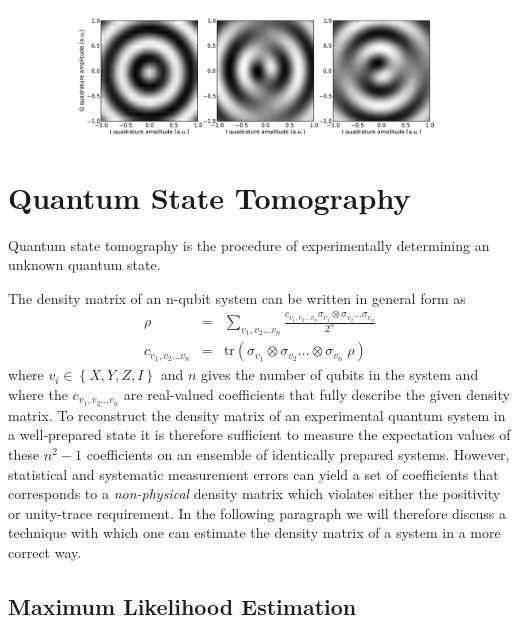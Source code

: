 \begin{figure}
	\centering
		\includegraphics[width=1.\textwidth]{"./data/ct5/2010_12_01 - iq tomography/iq_tomographies"}
	\label{fig:SingleQubitIQControl}
	\caption{}
\end{figure}

%
\section{Quantum State Tomography}

Quantum state tomography is the procedure of experimentally determining an unknown quantum state\citep{michael_a._nielsen_quantum_2000}.

The density matrix of an n-qubit system can be written in general form as
\begin{eqnarray}
\rho & = & \sum\limits_{v_1,v_2\hdots v_n} \frac{c_{v_1,v_2\hdots v_n} \sigma_{v_1}\otimes \sigma_{v_2}\hdots \sigma_{v_n}}{2^n} \label{eq:state_tomography_state_representation} \\
c_{v_1,v_2\hdots v_n} & = & \mathrm{tr}\left(\sigma_{v_1}\otimes \sigma_{v_2}\hdots \otimes\sigma_{v_n} \; \rho \right)  \label{eq:state_tomography_coefficients}
\end{eqnarray}
where $v_i \in \left\{ X,Y,Z,I\right\}$ and $n$ gives the number of qubits in the system and where the $c_{v_1,v_2\hdots v_n}$ are real-valued coefficients that fully describe the given density matrix. To reconstruct the density matrix of an experimental quantum system in a well-prepared state it is therefore sufficient to measure the expectation values of these $n^2-1$ coefficients on an ensemble of identically prepared systems. However, statistical and systematic measurement errors can yield a set of coefficients that corresponds to a {\it non-physical} density matrix which violates either the positivity or unity-trace requirement. In the following paragraph we will therefore discuss a technique with which one can estimate the density matrix of a system in a more correct way.

\subsection{Maximum Likelihood Estimation}

